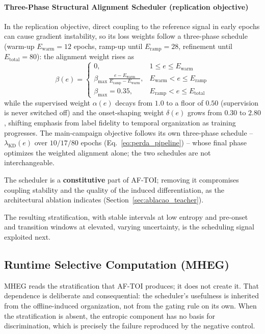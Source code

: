 \documentclass[a4paper,fleqn]{cas-dc}
\newcommand{\AFTOI}{\mbox{AF-TOI}\xspace}
\newcommand{\MHEG}{\mbox{MHEG}\xspace}
\begin{document}
\paragraph{Three-Phase Structural Alignment Scheduler (replication objective)}
{\color{\revcolor}In the replication objective, direct coupling to the
reference signal in early epochs can
cause gradient instability, so its loss weights follow a three-phase schedule
(warm-up $E_{\text{warm}}{=}12$ epochs, ramp-up until
$E_{\text{ramp}}{=}28$, refinement until $E_{\text{total}}{=}80$): the
alignment weight rises as
\begin{equation}
\beta(e)=
\begin{cases}
0, & 1 \leq e \leq E_{\text{warm}} \\[6pt]
\displaystyle\beta_{\max}\,\frac{e - E_{\text{warm}}}{E_{\text{ramp}} -
E_{\text{warm}}}, & E_{\text{warm}} < e \leq E_{\text{ramp}} \\[10pt]
\beta_{\max} = 0.35, & E_{\text{ramp}} < e \leq E_{\text{total}}
\end{cases}
\label{eq:scheduler_aftoi}
\end{equation}
while the supervised weight $\alpha(e)$ decays from $1.0$ to a floor of
$0.50$ (supervision is never switched off) and the onset-shaping weight
$\delta(e)$ grows from $0.30$ to $2.80$, shifting emphasis from label fidelity
to temporal organization as training progresses. The main-campaign objective
follows its own three-phase schedule -- $\lambda_{\mathrm{KD}}(e)$ over
$10/17/80$ epochs (Eq.~\ref{eq:perda_pipeline}) -- whose final phase
optimizes the weighted alignment alone; the two schedules are not
interchangeable.}

The scheduler is a \textbf{constitutive} part of \AFTOI; removing it compromises
coupling stability and the quality of the induced differentiation, as the
architectural ablation indicates (Section~\ref{sec:ablacao_teacher}).

The resulting stratification, with stable intervals at low entropy and pre-onset and transition windows at elevated, varying uncertainty, is the scheduling signal exploited next.
\subsection{Runtime Selective Computation (\mbox{MHEG})}
\label{sec:mheg}
\MHEG reads the stratification that \AFTOI produces; it does not create it. That
dependence is deliberate and consequential: the scheduler's usefulness is inherited
from the offline-induced organization, not from the gating rule on its own. {\color{\revcolor}When the stratification is absent, the entropic component has no basis for discrimination, which is precisely the failure reproduced by the negative control.}
\end{document}
